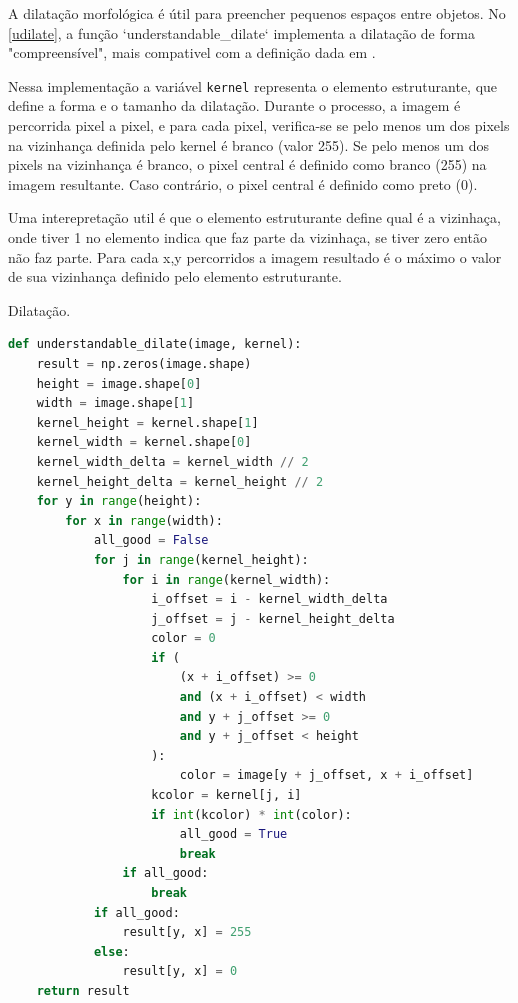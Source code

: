 \documentclass[english, 
               brazil, 
               bsc] %
               {dcomp-abntex2}
\begin{document}
 A dilatação morfológica é útil para preencher pequenos espaços entre objetos. No \autoref{udilate}, a função `understandable\_dilate` implementa a dilatação de forma "compreensível", mais compativel com a definição dada em .

 Nessa implementação a variável \texttt{kernel} representa o elemento estruturante, que define a forma e o tamanho da dilatação. Durante o processo, a imagem é percorrida pixel a pixel, e para cada pixel, verifica-se se pelo menos um dos pixels na vizinhança definida pelo kernel é branco (valor 255). Se pelo menos um dos pixels na vizinhança é branco, o pixel central é definido como branco (255) na imagem resultante. Caso contrário, o pixel central é definido como preto (0).

 Uma interepretação util é que o elemento estruturante define qual é a vizinhaça, onde tiver 1 no elemento indica que faz parte da vizinhaça, se tiver zero então não faz parte. Para cada x,y percorridos a imagem resultado é o máximo o valor de sua vizinhança definido pelo elemento estruturante.

\begin{codigo}[h]
  \caption{\small Dilatação.}
 \label{udilate}
\begin{lstlisting}[language=python]
def understandable_dilate(image, kernel):
    result = np.zeros(image.shape)
    height = image.shape[0]
    width = image.shape[1]
    kernel_height = kernel.shape[1]
    kernel_width = kernel.shape[0]
    kernel_width_delta = kernel_width // 2
    kernel_height_delta = kernel_height // 2
    for y in range(height):
        for x in range(width):
            all_good = False
            for j in range(kernel_height):
                for i in range(kernel_width):
                    i_offset = i - kernel_width_delta
                    j_offset = j - kernel_height_delta
                    color = 0
                    if (
                        (x + i_offset) >= 0
                        and (x + i_offset) < width
                        and y + j_offset >= 0
                        and y + j_offset < height
                    ):
                        color = image[y + j_offset, x + i_offset]
                    kcolor = kernel[j, i]
                    if int(kcolor) * int(color):
                        all_good = True
                        break
                if all_good:
                    break
            if all_good:
                result[y, x] = 255
            else:
                result[y, x] = 0
    return result
\end{lstlisting}
\end{codigo}
\end{document}

